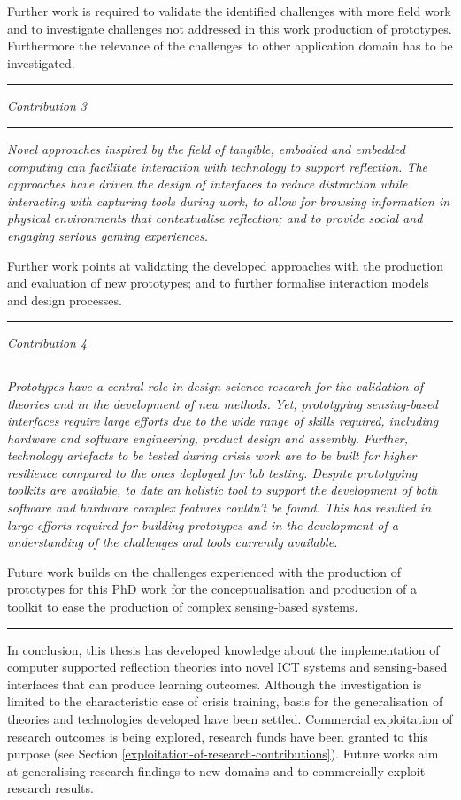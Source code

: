 Further work is required to validate the identified challenges with more field work and to investigate challenges not addressed in this work production of prototypes. Furthermore the relevance of the challenges to other application domain has to be investigated. \rule{
\textwidth}{.1pt} \medskip

\emph{Contribution 3} 
\newline \rule{
\textwidth}{.1pt} \emph{Novel approaches inspired by the field of tangible, embodied and embedded computing can facilitate interaction with technology to support reflection. The approaches have driven the design of interfaces to reduce distraction while interacting with capturing tools during work, to allow for browsing information in physical environments that contextualise reflection; and to provide social and engaging serious gaming experiences.}

Further work points at validating the developed approaches with the production and evaluation of new prototypes; and to further formalise interaction models and design processes.

\rule{
\textwidth}{.1pt}

\medskip

\emph{Contribution 4} 
\newline \rule{
\textwidth}{.1pt} \emph{Prototypes have a central role in design science research for the validation of theories and in the development of new methods. Yet, prototyping sensing-based interfaces require large efforts due to the wide range of skills required, including hardware and software engineering, product design and assembly. Further, technology artefacts to be tested during crisis work are to be built for higher resilience compared to the ones deployed for lab testing. Despite prototyping toolkits are available, to date an holistic tool to support the development of both software and hardware complex features couldn't be found. This has resulted in large efforts required for building prototypes and in the development of a understanding of the challenges and tools currently available.}

Future work builds on the challenges experienced with the production of prototypes for this PhD work for the conceptualisation and production of a toolkit to ease the production of complex sensing-based systems. 
\rule{
\textwidth}{.1pt}
\bigskip

In conclusion, this thesis has developed knowledge about the implementation of computer supported reflection theories into novel ICT systems and sensing-based interfaces that can produce learning outcomes. Although the investigation is limited to the characteristic case of crisis training, basis for the generalisation of theories and technologies developed have been settled. Commercial exploitation of research outcomes is being explored, research funds have been granted to this purpose (see Section \ref{exploitation-of-research-contributions}). Future works aim at generalising research findings to new domains and to commercially exploit research results. 
